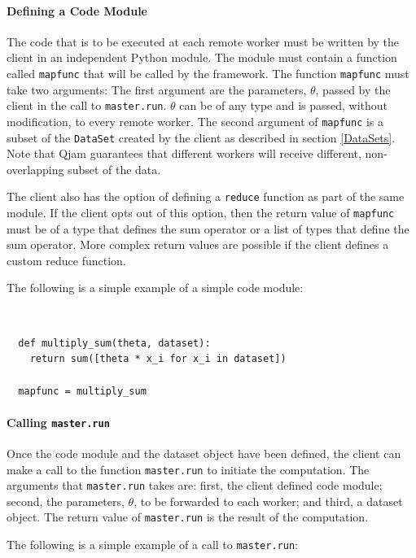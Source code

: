 \documentclass[%
  final,
  notitlepage,
  narroweqnarray,
  inline,
]{ieee}
\begin{document}
\paragraph{Defining a Code Module}

The code that is to be executed at each remote worker must be written by the
client in an independent Python module. The module must contain a function
called \texttt{mapfunc} that will be called by the framework. The function
\texttt{mapfunc} must take two arguments: The first argument are the parameters,
$\theta$, passed by the client in the call to \texttt{master.run}. $\theta$ can
be of any type and is passed, without modification, to every remote worker. The
second argument of \texttt{mapfunc} is a subset of the \texttt{DataSet} created
by the client as described in section \ref{DataSets}. Note that Qjam guarantees
that different workers will receive different, non-overlapping subset of the
data.

The client also has the option of defining a \texttt{reduce} function as part
of the same module. If the client opts out of this option, then the return
value of \texttt{mapfunc} must be of a type that defines the sum operator or
a list of types that define the sum operator. More complex return values are
possible if the client defines a custom reduce function.

The following is a simple example of a simple code module:

{\tt \small
\begin{verbatim}
  def multiply_sum(theta, dataset):
    return sum([theta * x_i for x_i in dataset])

  mapfunc = multiply_sum
\end{verbatim}}


\paragraph{Calling \texttt{master.run}}

Once the code module and the dataset object have been defined, the client can
make a call to the function \texttt{master.run} to initiate the computation. The
arguments that \texttt{master.run} takes are: first, the client defined code
module; second, the parameters, $\theta$, to be forwarded to each worker; and
third, a dataset object. The return value of \texttt{master.run} is the result
of the computation.

The following is a simple example of a call to \texttt{master.run}:
\end{document}

